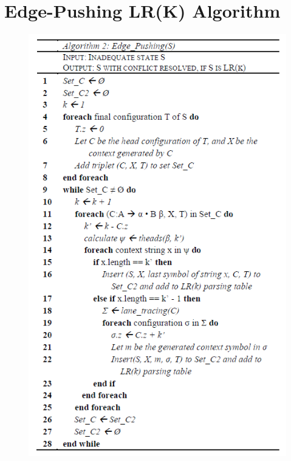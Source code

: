 \documentclass{sig-alternate-05-2015}
\begin{document}
\section{Edge-Pushing LR(K) Algorithm}
\begin{figure}[!htbp]
\centering
\includegraphics[scale=0.6]{figure7.PNG}
\end{figure}
\end{document}
